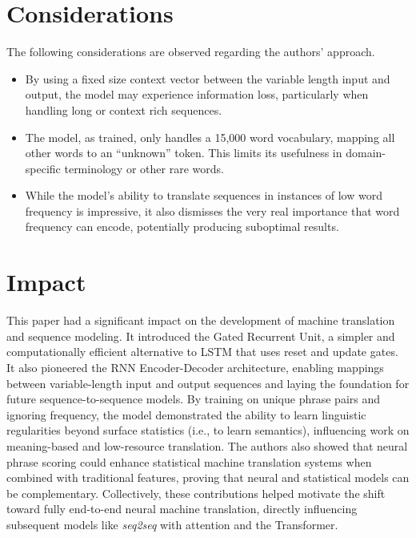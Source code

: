 \documentclass[10pt]{article}
\begin{document}
\section*{Considerations}
The following considerations are observed regarding the authors' approach.
\begin{itemize}
    \item By using a fixed size context vector between the variable length input and output, the model may experience information loss, particularly when handling long or context rich sequences.
    \item The model, as trained, only handles a 15,000 word vocabulary, mapping all other words to an ``unknown'' token. This limits its usefulness in domain-specific terminology or other rare words.
    \item While the model's ability to translate sequences in instances of low word frequency is impressive, it also dismisses the very real importance that word frequency can encode, potentially producing suboptimal results.
\end{itemize}

\section*{Impact}
This paper had a significant impact on the development of machine translation and sequence modeling. It introduced the Gated Recurrent Unit, a simpler and computationally efficient alternative to LSTM that uses reset and update gates. It also pioneered the RNN Encoder-Decoder architecture, enabling mappings between variable-length input and output sequences and laying the foundation for future sequence-to-sequence models. By training on unique phrase pairs and ignoring frequency, the model demonstrated the ability to learn linguistic regularities beyond surface statistics (i.e., to learn semantics), influencing work on meaning-based and low-resource translation. The authors also showed that neural phrase scoring could enhance statistical machine translation systems when combined with traditional features, proving that neural and statistical models can be complementary. Collectively, these contributions helped motivate the shift toward fully end-to-end neural machine translation, directly influencing subsequent models like \textit{seq2seq} with attention and the Transformer.



\end{document}
